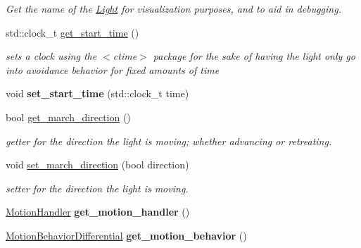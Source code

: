 \begin{DoxyCompactItemize}
\begin{DoxyCompactList}\small\item\em Get the name of the \hyperlink{classLight}{Light} for visualization purposes, and to aid in debugging. \end{DoxyCompactList}\item 
std\+::clock\+\_\+t \hyperlink{classLight_a20bb393fff4b9bd9c632bb78105088b6}{get\+\_\+start\+\_\+time} ()\hypertarget{classLight_a20bb393fff4b9bd9c632bb78105088b6}{}\label{classLight_a20bb393fff4b9bd9c632bb78105088b6}

\begin{DoxyCompactList}\small\item\em sets a clock using the $<$ctime$>$ package for the sake of having the light only go into avoidance behavior for fixed amounts of time \end{DoxyCompactList}\item 
void {\bfseries set\+\_\+start\+\_\+time} (std\+::clock\+\_\+t time)\hypertarget{classLight_a5c1d7517b246e99c4be79cff2089fd30}{}\label{classLight_a5c1d7517b246e99c4be79cff2089fd30}

\item 
bool \hyperlink{classLight_ab76d4dbfd7b7a0fc0d3e83e5e78cb5d1}{get\+\_\+march\+\_\+direction} ()
\begin{DoxyCompactList}\small\item\em getter for the direction the light is moving; whether advancing or retreating. \end{DoxyCompactList}\item 
void \hyperlink{classLight_a76cdf1ab10d9cd97468d17c149e5b14a}{set\+\_\+march\+\_\+direction} (bool direction)
\begin{DoxyCompactList}\small\item\em setter for the direction the light is moving. \end{DoxyCompactList}\item 
\hyperlink{classMotionHandler}{Motion\+Handler} {\bfseries get\+\_\+motion\+\_\+handler} ()\hypertarget{classLight_a545dceae2ac3cb97cbaf51042b2d80e2}{}\label{classLight_a545dceae2ac3cb97cbaf51042b2d80e2}

\item 
\hyperlink{classMotionBehaviorDifferential}{Motion\+Behavior\+Differential} {\bfseries get\+\_\+motion\+\_\+behavior} ()\hypertarget{classLight_af8a67e1e3d3e6b21c169cfd6bdaa8ab2}{}\label{classLight_af8a67e1e3d3e6b21c169cfd6bdaa8ab2}

\end{DoxyCompactItemize}
